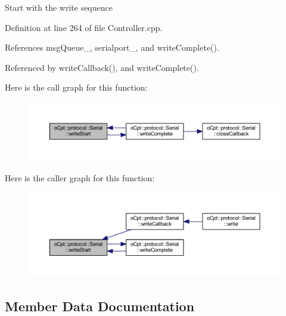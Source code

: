 Start with the write sequence 

Definition at line 264 of file Controller.\+cpp.



References msg\+Queue\+\_\+, serialport\+\_\+, and write\+Complete().



Referenced by write\+Callback(), and write\+Complete().

Here is the call graph for this function\+:\nopagebreak
\begin{figure}[H]
\begin{center}
\leavevmode
\includegraphics[width=350pt]{classo_cpt_1_1protocol_1_1_serial_a1fedc27e16c383de81e5a05fee742581_cgraph}
\end{center}
\end{figure}
Here is the caller graph for this function\+:\nopagebreak
\begin{figure}[H]
\begin{center}
\leavevmode
\includegraphics[width=350pt]{classo_cpt_1_1protocol_1_1_serial_a1fedc27e16c383de81e5a05fee742581_icgraph}
\end{center}
\end{figure}


\subsection{Member Data Documentation}
\hypertarget{classo_cpt_1_1protocol_1_1_serial_ad24eda3d37c870d3f83af0a67d63d2ae}{}\label{classo_cpt_1_1protocol_1_1_serial_ad24eda3d37c870d3f83af0a67d63d2ae} 
